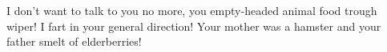 \documentclass[busletter]{newlfm}        %
\begin{document}
\begin{newlfm}

I don't want to talk to you no more, you empty-headed animal food trough
wiper! I fart in your general direction! Your mother was a hamster and your
father smelt of elderberries! 

\end{newlfm}
\end{document}
